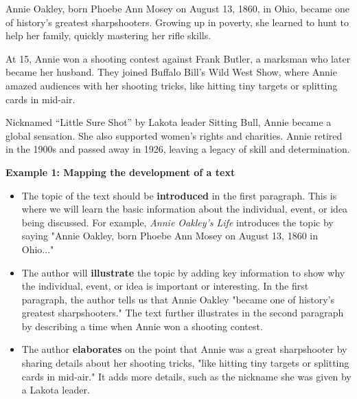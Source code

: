 \documentclass[12pt]{article}
\begin{document}
\begin{tcolorbox}[colframe=black!60, colback=white, 
coltitle=black, colbacktitle=black!15, fonttitle=\bfseries\Large, 
title=Text: Annie Oakley's Life, halign title=center, left=10pt, right=10pt, top=10pt, bottom=15pt]
 

Annie Oakley, born Phoebe Ann Mosey on August 13, 1860, in Ohio, became one of history’s greatest sharpshooters. Growing up in poverty, she learned to hunt to help her family, quickly mastering her rifle skills.

At 15, Annie won a shooting contest against Frank Butler, a marksman who later became her husband. They joined Buffalo Bill’s Wild West Show, where Annie amazed audiences with her shooting tricks, like hitting tiny targets or splitting cards in mid-air.

Nicknamed “Little Sure Shot” by Lakota leader Sitting Bull, Annie became a global sensation. She also supported women’s rights and charities. Annie retired in the 1900s and passed away in 1926, leaving a legacy of skill and determination.


\end{tcolorbox}

\vspace{1em}

\begin{tcolorbox}[colframe=black!60, colback=white, 
coltitle=black, colbacktitle=black!15, fonttitle=\bfseries\Large, 
title=Examples, halign title=center, left=10pt, right=10pt, top=10pt, bottom=15pt]

\textbf{Example 1: Mapping the development of a text}
\begin{itemize}
    \item The topic of the text should be \textbf{introduced }in the first paragraph. This is where we will learn the basic information about the individual, event, or idea being discussed. For example, \textit{Annie Oakley's Life} introduces the topic by saying "Annie Oakley, born Phoebe Ann Mosey on August 13, 1860 in Ohio..."
    \item The author will \textbf{illustrate} the topic by adding key information to show why the individual, event, or idea is important or interesting. In the first paragraph, the author tells us that Annie Oakley "became one of history's greatest sharpshooters." The text further illustrates in the second paragraph by describing a time when Annie won a shooting contest. 
    \item The author \textbf{elaborates} on the point that Annie was a great sharpshooter by sharing details about her shooting tricks, "like hitting tiny targets or splitting cards in mid-air." It adds more details, such as the nickname she was given by a Lakota leader. 
  
\end{itemize}

\end{tcolorbox}
\end{document}
